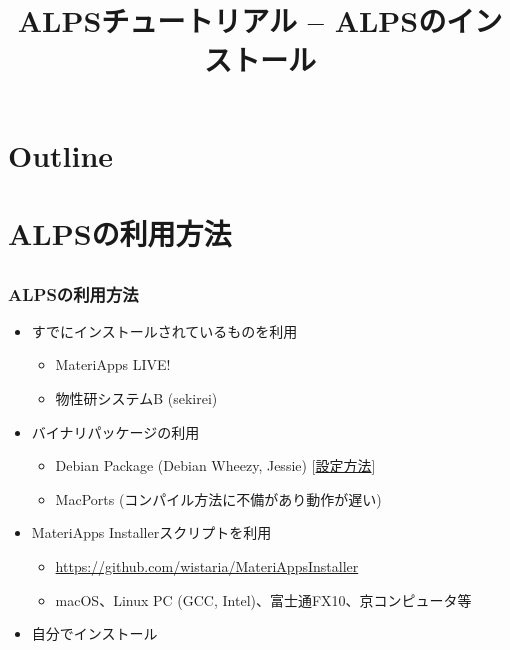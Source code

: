 \title{ALPSチュートリアル -- ALPSのインストール}



\begin{frame}
  \titlepage
\end{frame}

\section*{Outline}
\begin{frame}
  \tableofcontents
\end{frame}

\section{ALPSの利用方法}
\subsection*{\redb\whiteb\greenb}

\begin{frame}[fragile]
  \frametitle{ALPSの利用方法}
  \begin{itemize}
    \setlength{\itemsep}{1em}
  \item すでにインストールされているものを利用
    \begin{itemize}
    \item MateriApps LIVE!
    \item 物性研システムB (sekirei)
    \end{itemize}
  \item バイナリパッケージの利用
    \begin{itemize}
    \item Debian Package (Debian Wheezy, Jessie) [\href{https://github.com/cmsi/MateriAppsLive/wiki/UsingMateriAppsInDebian}{設定方法}]
    \item MacPorts (コンパイル方法に不備があり動作が遅い)
    \end{itemize}
  \item MateriApps Installerスクリプトを利用
    \begin{itemize}
    \item \url{https://github.com/wistaria/MateriAppsInstaller}
    \item macOS、Linux PC (GCC, Intel)、富士通FX10、京コンピュータ等
    \end{itemize}
  \item 自分でインストール
  \end{itemize}
\end{frame}


